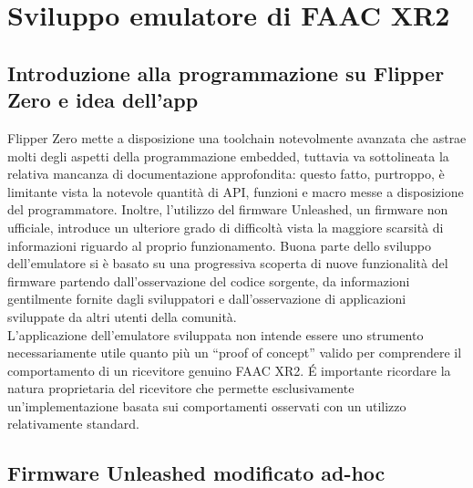 \chapter{Sviluppo emulatore di FAAC XR2}
\label{cha:development}

\section{Introduzione alla programmazione su Flipper Zero e idea dell’app}
\label{sec:intro_emu}

Flipper Zero mette a disposizione una toolchain notevolmente avanzata che astrae molti degli aspetti della programmazione embedded, tuttavia va sottolineata la relativa mancanza di documentazione approfondita: questo fatto, purtroppo, è limitante vista la notevole quantità di API, funzioni e macro messe a disposizione del programmatore. Inoltre, l’utilizzo del firmware Unleashed, un firmware non ufficiale, introduce un ulteriore grado di difficoltà vista la maggiore scarsità di informazioni riguardo al proprio funzionamento. Buona parte dello sviluppo dell’emulatore si è basato su una progressiva scoperta di nuove funzionalità del firmware partendo dall’osservazione del codice sorgente, da informazioni gentilmente fornite dagli sviluppatori e dall’osservazione di applicazioni sviluppate da altri utenti della comunità. \\
L’applicazione dell’emulatore sviluppata non intende essere uno strumento necessariamente utile quanto più un “proof of concept” valido per comprendere il comportamento di un ricevitore genuino FAAC XR2. É importante ricordare la natura proprietaria del ricevitore che permette esclusivamente un’implementazione basata sui comportamenti osservati con un utilizzo relativamente standard.

\section{Firmware Unleashed modificato ad-hoc}
\label{sec:unleashed_mod}

